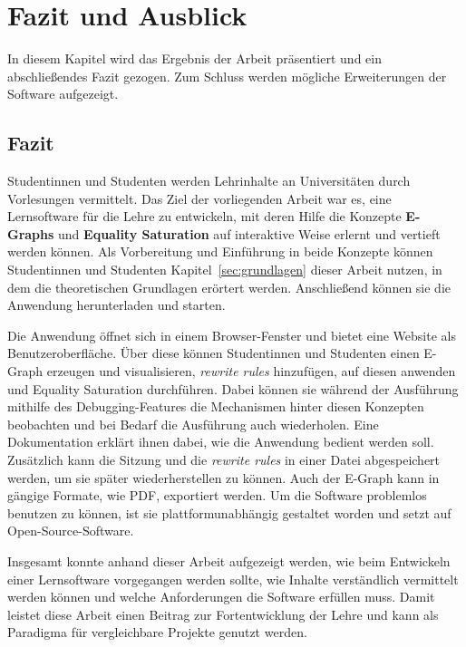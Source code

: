 \section{Fazit und Ausblick}\label{sec:fazit}

In diesem Kapitel wird das Ergebnis der Arbeit präsentiert und ein abschließendes Fazit gezogen. Zum Schluss werden mögliche Erweiterungen der Software aufgezeigt. 

\subsection{Fazit}

Studentinnen und Studenten werden Lehrinhalte an Universitäten durch Vorlesungen vermittelt. Das Ziel der vorliegenden Arbeit war es, eine Lernsoftware für die Lehre
zu entwickeln, mit deren Hilfe die Konzepte \textbf{E-Graphs} und \textbf{Equality Saturation} auf interaktive Weise erlernt und vertieft werden können.
Als Vorbereitung und Einführung in beide Konzepte können Studentinnen und Studenten Kapitel~\ref{sec:grundlagen} dieser Arbeit nutzen, in dem die theoretischen Grundlagen erörtert werden.
Anschließend können sie die Anwendung herunterladen und starten. 

Die Anwendung öffnet sich in einem Browser-Fenster und bietet eine Website als Benutzeroberfläche. Über diese können Studentinnen und Studenten einen E-Graph erzeugen und visualisieren, 
\textit{rewrite rules} hinzufügen, auf diesen anwenden und Equality Saturation durchführen. 
Dabei können sie während der Ausführung mithilfe des Debugging-Features die Mechanismen hinter diesen Konzepten beobachten und bei Bedarf die Ausführung auch wiederholen.
Eine Dokumentation erklärt ihnen dabei, wie die Anwendung bedient werden soll. Zusätzlich kann die Sitzung und die \textit{rewrite rules} in einer Datei abgespeichert werden, um
sie später wiederherstellen zu können. Auch der E-Graph kann in gängige Formate, wie PDF, exportiert werden.
Um die Software problemlos benutzen zu können, ist sie plattformunabhängig gestaltet worden und setzt auf Open-Source-Software.





Insgesamt konnte anhand dieser Arbeit aufgezeigt werden, wie beim Entwickeln einer Lernsoftware vorgegangen werden sollte, wie Inhalte verständlich vermittelt werden können und welche
Anforderungen die Software erfüllen muss.
Damit leistet diese Arbeit einen Beitrag zur Fortentwicklung der Lehre und kann als Paradigma für vergleichbare Projekte genutzt werden.


